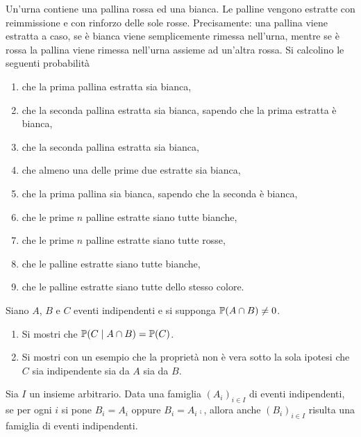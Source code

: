 Un'urna contiene una pallina rossa ed una bianca. Le palline vengono estratte con reimmissione e con rinforzo delle sole rosse. Precisamente: una pallina viene estratta a caso, se è bianca viene semplicemente rimessa nell'urna, mentre se è rossa la pallina viene rimessa nell'urna assieme ad un'altra rossa. Si calcolino le seguenti probabilità
\begin{enumerate}
	\item che la prima pallina estratta sia bianca,
	\item che la seconda pallina estratta sia bianca, sapendo che la prima estratta è bianca,
	\item che la seconda pallina estratta sia bianca,
	\item che almeno una delle prime due estratte sia bianca,
	\item che la prima pallina sia bianca, sapendo che la seconda è bianca,
	\item che le prime $n$ palline estratte siano tutte bianche,
	\item che le prime $n$ palline estratte siano tutte rosse,
	\item che le palline estratte siano tutte bianche,
	\item che le palline estratte siano tutte dello stesso colore.
\end{enumerate}

\Esercizio{}

Siano $A$, $B$ e $C$ eventi indipendenti e si supponga $\mathbb{P}( A\cap B) \neq 0$.
\begin{enumerate}
	\item Si mostri che $\mathbb{P}( C\mid A\cap B) =\mathbb{P}( C)$.
	\item Si mostri con un esempio che la proprietà non è vera sotto la sola ipotesi che $C$ sia indipendente sia da $A$ sia da $B$.
\end{enumerate}

\Esercizio{}

Sia $I$ un insieme arbitrario. Data una famiglia $( A_{i})_{i\in I}$ di eventi indipendenti, se per ogni $i$ si pone $B_{i} =A_{i}$ oppure $B_{i} =A_{i}\comp$, allora anche $( B_{i})_{i\in I}$ risulta una famiglia di eventi indipendenti.

\ParteSoluzioni

\Soluzione

